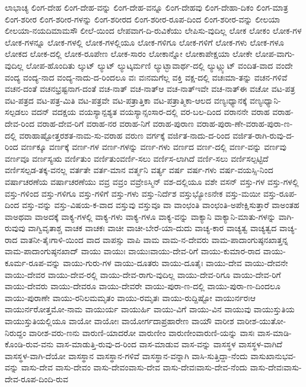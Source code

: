 {ಲಾಭಾಚ್ಯ
ಲಿಂಗ-ದೇಹ
ಲಿಂಗ-ದೇಹ-ವನ್ನು
ಲಿಂಗ-ದೇಹ-ವನ್ನೂ
ಲಿಂಗ-ದೇಹವು
ಲಿಂಗ-ದೇಹಾ-ದಿಕಂ
ಲಿಂಗ-ಮಾತ್ರ
ಲಿಂಗ-ಶರೀರ
ಲಿಂಗ-ಶರೀರ-ಗಳನ್ನು
ಲಿಂಗ-ಶರೀರದ
ಲಿಂಗ-ಶರೀರ-ರೂಪ-ದಿಂದ
ಲಿಂಗ-ಶರೀರ-ವನ್ನು
ಲೀಲಯಾ
ಲೀಲಯಾ-ನಯದಿಮಾಮಸೌ
ಲೀಲೆ-ಯಿಂದ
ಲೇಪವಾಗ-ದಿ-ರುವಿಕೆಯು
ಲೇಪಿಸು-ವುದಿಲ್ಲ
ಲೋಕ
ಲೋಕಂ
ಲೋಕ-ಗಳ
ಲೋಕ-ಗಳನ್ನೂ
ಲೋಕ-ಗಳಲ್ಲಿ
ಲೋಕ-ಗಳಲ್ಲಿಯೂ
ಲೋಕ-ಗಳಿಗೂ
ಲೋಕ-ಗಳಿಗೆ
ಲೋಕ-ಗಳು
ಲೋಕ-ಗಳೂ
ಲೋಕದ
ಲೋಕ-ದಲ್ಲಿ
ಲೋಕ-ರೂಪೇಣ
ಲೋಕ-ಸಾರಂ
ಲೋಕಾನ್ನೋ
ಲೋಕಾಪೇಕ್ಷಯಾ
ಲೋಕೇ
ಲೋಪ-ವಾಗು-ವುದಿಲ್ಲ
ಲೋಪ-ಹೊಂದಿತು
ಲ್ಕುಟ್
ಲ್ಯುಟ್
ಲ್ಯುಟ್ಕರ್ಮಣಿ
ಲ್ಯುಟ್ಭಾವಾರ್ಥ-ದಲ್ಲಿ
ಲ್ಯುಟ್ಲ್ಯುಟ್
ವಂದಿತ-ವಾದ
ವಂದೇ
ವಂದ್ಯ
ವಂದ್ಯ-ನಾದ
ವಂದ್ಯ-ನಾದು-ದ-ರಿಂದಲೂ
ವಃ
ವಃನಮಗೆಲ್ಲ
ವಕ್ತಿ
ವಕ್ಷ-ದಲ್ಲಿ
ವಚಃಮಾ-ತನ್ನು
ವಚನ-ಗಳಿವೆ
ವಚನ-ದಂತೆ
ವಚನಭ್ರಷ್ಟನಾಗ-ದಂತೆ
ವಚ-ನಾತ್
ವಚ-ನಾತ್ಆ
ವಚ-ನಾತ್ಇವೇ
ವಚ-ನಾತ್ಈ
ವಚೋ
ವಟ-ಪತ್ರ
ವಟ-ಪತ್ರದ
ವಟ-ಪತ್ರ-ಮಿತಿ
ವಟ-ಪತ್ರವೇ
ವಟ-ಪತ್ರಾತ್ತಿಕಾ
ವಟ-ಪತ್ರಾತ್ಮಿಕಾ-ಆಲದ
ವಣ್ಯಃಧ್ಯಾನಕ್ಕೆ
ವಣ್ಯಃಧ್ಯಾನಿ-ಸಲ್ಪಡಲು
ವದನ್
ವದಕ್ಷಯ
ವಯಸ್ಯಾನ್ಪಶ್ಯತ
ವಯಸ್ಯಾನ್ಸಂಸಾರ-ದಲ್ಲಿ
ವರ-ಬಲ-ದಿಂದ
ವರಾನನೇ
ವರಾಹ
ವರಾಹ-ದೇವ-ರಿಂದ
ವರಾಹ-ದೇವ-ರಿಗೆ
ವರಾಹ-ನರ
ವರಾಹ-ನಿಗೆ
ವರಾಹ-ಪುರಾಣ
ವರಾಹ-ಪುರಾ-ಣೇ-ವರಾಹ-ಪುರಾ-ಣ-ದಲ್ಲಿ
ವರಾಹಾಷ್ಟೋತ್ತರಶತ-ನಾಮ-ಸು-ವರಾಹ
ವರುಣ
ವರ್ಗಕ್ಕೆ
ವರ್ಜಿತ-ನಾದು-ದ-ರಿಂದ
ವರ್ಜಿತ-ರಾಗಿ-ರುವು-ದ-ರಿಂದ
ವರ್ಣಕ್ಕೂ
ವರ್ಣಕ್ಕೆ
ವರ್ಣ-ಗಳ
ವರ್ಣ-ಗಳನ್ನು
ವರ್ಣ-ಗಳು
ವರ್ಣದ
ವರ್ಣ-ದಲ್ಲಿ
ವರ್ಣ-ವನ್ನು
ವರ್ಣವು
ವರ್ಣವೂ
ವರ್ಣಸ್ಯಋ
ವರ್ಣಿತುಂ
ವರ್ಣಿತುಂವರ್ಣಿ-ಸಲು
ವರ್ಣಿಸ-ಲಾಗಿದೆ
ವರ್ಣಿ-ಸಲು
ವರ್ಣಿಸಲ್ಪಟ್ಟಿದೆ
ವರ್ಣಿಸಲ್ಪಡ-ತಕ್ಕ-ವನಲ್ಲ
ವರ್ತತೇ
ವರ್ತ-ಮಾನ
ವರ್ತ್ಮನಿ
ವರ್ತ್ಯ
ವರ್ಷ
ವರ್ಷ-ಗಳು
ವರ್ಷ-ವಯಸ್ಸಿ-ನಿಂದ
ವರ್ಷಾಚರಣೆಯ
ವರ್ಷಾಚರಣೆಯು
ವವ್ರ
ವವ್ರಂ
ವವ್ರೇಽಸ್ಮಿನ್
ವಶ-ದಲ್ಲಿಯೂ
ವಶೇ
ವಸನ್
ವಸ್ತು-ಗಳ
ವಸ್ತು-ಗಳಲ್ಲಿ
ವಸ್ತು-ಗಳಿಂದ
ವಸ್ತು-ಗಳಿಗೂ
ವಸ್ತು-ಗಳಿಗೆ
ವಸ್ತು-ಗಳು
ವಸ್ತು-ನಿರ್ದೆಶ
ವಸ್ತುಭ್ಯೋಽನೇಕ
ವಸ್ತು-ಮಯೀ
ವಸ್ತು-ರೂಪ-ದಿಂದ
ವಸ್ತು-ವನ್ನು
ವಸ್ತು-ವಿಷಯ-ಕ-ವಾದ
ವಸ್ತುವು
ವಸ್ತುವೂ
ವಾ
ವಾಂಛಂತಿ
ವಾಂಛಂತಿ-ಅಪೇಕ್ಷಿಸುತ್ತಾರೆ
ವಾಅಂತಹ
ವಾಅಥವಾ
ವಾಅದಕ್ಕೆ
ವಾಕ್ಯ-ಗಳಲ್ಲಿ
ವಾಕ್ಯ-ಗಳು
ವಾಕ್ಯ-ಗಳೂ
ವಾಕ್ಯ-ವನ್ನು
ವಾಕ್ಯಾನಿ
ವಾಕ್ಯಾನಿ-ಮಾತು-ಗಳನ್ನು
ವಾಗಿ-ರುವುವು
ವಾಗ್ವಿವೃತಾಶ್ಚ
ವಾಚಕ
ವಾಚಕಃ
ವಾಚೀ
ವಾಚೀ-ಬೇರೆ-ಯಾ-ದುದು
ವಾಚ್ಯ-ಕಾರ
ವಾಚ್ಯತ್ವ
ವಾಚ್ಯತ್ವದ
ವಾಚ್ಯ-ರಾದ
ವಾತನೀ-ತೈಃಗಾಳಿ-ಯಿಂದ
ವಾದ
ವಾಪಸ್ಸು
ವಾಪಿ
ವಾಮ
ವಾಮ-ನ-ದೇವರು
ವಾಮ-ಪಾದಾಂಗುಷ್ಠನಖಾತ್ತನ್ನ
ವಾಮ-ಪಾದಾಂಗುಷ್ಠನಖಾದ್
ವಾಯು
ವಾಯುಃ
ವಾಯುಃವಾಯು-ದೇವ-ರಿಗೆ
ವಾಯು-ಕುಮಾರ-ರಾದ
ವಾಯು-ಕೂರ್ಮ-ರೂಪ-ವನ್ನು
ವಾಯು-ಗುರು-ಗಳ
ವಾಯು-ದೂತರು
ವಾಯು-ದೂತೈಃ
ವಾಯು-ದೇವ
ವಾಯು-ದೇವನೇ
ವಾಯು-ದೇವರ
ವಾಯು-ದೇವ-ರಲ್ಲಿ
ವಾಯು-ದೇವ-ರಾಗು-ವುದಿಲ್ಲ
ವಾಯು-ದೇವ-ರಿಗೂ
ವಾಯು-ದೇವ-ರಿಗೆ
ವಾಯು-ದೇವರು
ವಾಯು-ದೇವರೂ
ವಾಯು-ದೇವರೇ
ವಾಯು-ಪುರಾ-ಣ-ದಲ್ಲಿ
ವಾಯು-ಪುರಾ-ಣ-ದಿಂದಲೂ
ವಾಯು-ಪುರಾಣೇ
ವಾಯು-ರನಿಲಮಮೃತಂ
ವಾಯು-ರಮೃತಃ
ವಾಯು-ರುದ್ದಿಷ್ಟೋ
ವಾಯುರ್ನರಃಆ
ವಾಯುರ್ನರೋತ್ತಮೋ-ನಾಮ
ವಾಯುರ್ಯ
ವಾಯುರ್ಹಿ
ವಾಯು-ವಿಗೆ
ವಾಯು-ವಿನ
ವಾಯುವು
ವಾಯುಸ್ತುತಿಯ
ವಾಯುಸ್ತುತಿಯಲ್ಲಿಯೂ
ವಾಯೋ
ವಾಯೋಃ
ವಾಯೋರ್ಗದಾಪ್ರಹಾರೇಣ
ವಾಯೌ
ವಾರೀಶ
ವಾರೀಶ-ಯುತೋ-ನಿರುದ್ದಂ
ವಾರೀಶ-ವರು-ಣನು
ವಾರುಣಿ-ಯಾದರೋ
ವಾರುಣೀಂ
ವಾರುಣೀಂವಾರುಣಿ-ಯನ್ನು
ವಾಸಃ
ವಾಸ-ಮಾಡಿ-ಕೊಂಡಿ-ರುವ-ವನು
ವಾಸ-ಮಾಡುತ್ತಿ-ರುವು-ದ-ರಿಂದ
ವಾಸ-ಮಾಡುವ
ವಾಸ-ವನ್ನು
ವಾಸಸ್ಥಳ
ವಾಸಸ್ಥಳ-ವಾಗಿದೆ
ವಾಸಸ್ಥಳ-ವಾಗಿ-ದೆಯೋ
ವಾಸಸ್ಥಾನ
ವಾಸಸ್ಥಾನ-ಗಳಿವೆ
ವಾಸಸ್ಥಾನ-ವನ್ನಾಗಿ
ವಾಸಿ-ಸುತ್ತಿದ್ದಾ-ನೆಂದು
ವಾಸುಖಾನುಭವ-ವನ್ನು
ವಾಸು-ದೇವ
ವಾಸು-ದೇವಂ
ವಾಸು-ದೇವಂವಾಸು-ದೇವ
ವಾಸು-ದೇವಃವಾಸು-ದೇವ-ನೆಂದು
ವಾಸು-ದೇವಃವಾಸು-ದೇವ-ರೂಪ-ದಿಂದಿ-ರುವ
}
